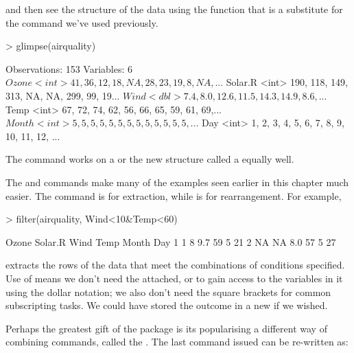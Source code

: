and then see the structure of the data using the  function that is a substitute for the  command we've used previously. 

\begin{Schunk}
\begin{Sinput}
> glimpse(airquality) 
\end{Sinput}
\begin{Soutput}
Observations: 153
Variables: 6
$ Ozone   <int> 41, 36, 12, 18, NA, 28, 23, 19, 8, NA, ...
$ Solar.R <int> 190, 118, 149, 313, NA, NA, 299, 99, 19...
$ Wind    <dbl> 7.4, 8.0, 12.6, 11.5, 14.3, 14.9, 8.6, ...
$ Temp    <int> 67, 72, 74, 62, 56, 66, 65, 59, 61, 69,...
$ Month   <int> 5, 5, 5, 5, 5, 5, 5, 5, 5, 5, 5, 5, 5, ...
$ Day     <int> 1, 2, 3, 4, 5, 6, 7, 8, 9, 10, 11, 12, ...
\end{Soutput}
\end{Schunk}

The  command works on a  or the new structure called a  equally well. 
  
The  and  commands make many of the examples seen earlier in this chapter much easier. The  command is for extraction, while  is for rearrangement. For example, 

\begin{Schunk}
\begin{Sinput}
> filter(airquality, Wind<10&Temp<60) 
\end{Sinput}
\begin{Soutput}
  Ozone Solar.R Wind Temp Month Day
1     1       8  9.7   59     5  21
2    NA      NA  8.0   57     5  27
\end{Soutput}
\end{Schunk}

extracts the rows of the  data that meet the combinations of conditions specified.  
Use of  means we don't need the  attached, or to gain access to the variables in it using the dollar notation; we also don't need the square brackets for common subscripting tasks. We could have stored the outcome in a new  if we wished. 
 
Perhaps the greatest gift of the  package is its popularising a different way of combining commands, called the . The last command issued can be re-written as: 


